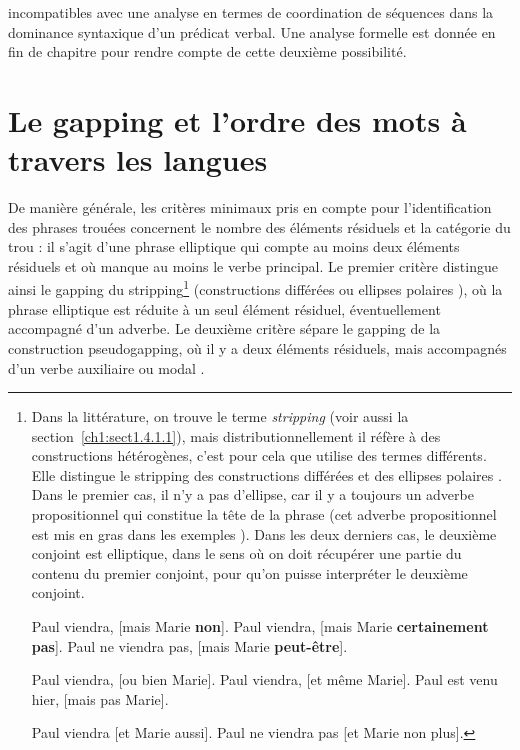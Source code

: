 incompatibles avec une analyse en termes de coordination de séquences dans la dominance syntaxique d’un prédicat verbal. Une analyse formelle est donnée en fin de chapitre pour rendre compte de cette deuxième possibilité.  

\section{Le gapping et l’ordre des mots à travers les langues} \label{ch2:sect2.2}
\largerpage[-2]
De manière générale, les critères minimaux pris en compte pour l’identification des phrases trouées concernent le nombre des éléments résiduels et la catégorie du trou : il s’agit d’une phrase elliptique qui compte au moins deux éléments résiduels et où manque au moins le verbe principal. Le premier critère distingue ainsi le gapping du stripping\footnote{\label{ch2:fn3} Dans la littérature, on trouve le terme \textit{stripping} (voir aussi la section~\ref{ch1:sect1.4.1.1}), mais distributionnellement il réfère à des constructions hétérogènes, c’est pour cela que \citet{Abeille2006,AbeilleToAppear} utilise des termes différents. Elle distingue le stripping  des constructions différées  et des ellipses polaires . Dans le premier cas, il n’y a pas d’ellipse, car il y a toujours un adverbe propositionnel qui constitue la tête de la phrase (cet adverbe propositionnel est mis en gras dans les exemples ). Dans les deux derniers cas, le deuxième conjoint est elliptique, dans le sens où on doit récupérer une partie du contenu du premier conjoint, pour qu’on puisse interpréter le deuxième conjoint.

\ea \label{ch2:foot3:exi}
\ea Paul viendra, [mais Marie \textbf{non}].
\ex Paul viendra, [mais Marie \textbf{certainement pas}].
\ex  Paul ne viendra pas, [mais Marie \textbf{peut-être}].
\z
\z

\ea \label{ch2:foot3:exii}
\ea Paul viendra, [ou bien Marie].
\ex Paul viendra, [et même Marie].
\ex Paul est venu hier, [mais pas Marie].
\z
\z

\ea \label{ch2:foot3:exiii}
\ea Paul viendra [et Marie aussi].
\ex Paul ne viendra pas [et Marie non plus].
\z
\z
} (constructions différées  ou ellipses polaires ), où la phrase elliptique est réduite à un seul élément résiduel, éventuellement accompagné d’un adverbe. Le deuxième critère sépare le gapping de la construction pseudogapping, où il y a deux éléments résiduels, mais accompagnés d’un verbe auxiliaire ou modal . 

